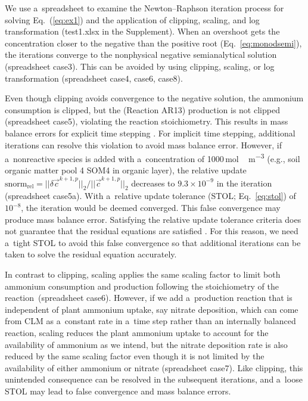 \documentclass[gmd,noline]{copernicus}
\begin{document}
      We use a~spreadsheet to examine the Newton--Raphson iteration process
      for solving Eq.~(\ref{eq:ex1}) and the application of clipping,
      scaling, and log transformation (test1.xlsx  in the Supplement). When an overshoot
      gets the concentration closer to the negative than the positive root
      (Eq.~\ref{eq:monodsemi}), the iterations converge to the nonphysical
      negative semianalytical solution (spreadsheet case3).  This can be
      avoided by using clipping, scaling, or log transformation (spreadsheet
      case4, case6, case8).

      Even though clipping avoids convergence to the negative solution, the
      ammonium consumption is clipped, but the   (Reaction AR13) production is
      not clipped (spreadsheet case5), violating the reaction
      stoichiometry. This results in mass balance errors for explicit time
      stepping \citep{Tang2015}. For implicit time stepping, additional
      iterations can resolve this violation to avoid mass balance error.
      However, if a~nonreactive species is added with a~concentration of
      1000\,\unit{mol\,m^{-3}} (e.g., soil organic matter pool 4 SOM4 in
      organic layer), the relative update $\text{snorm}_{\text{rel}}= {\vert\vert
      \delta \vec{c}^{k+1,p} \vert\vert_2} / {\vert\vert \vec{c}^{k+1,p} \vert\vert
      _2}$ decreases to $9.3\times 10^{-9}$ in the iteration (spreadsheet
      case5a). With a~relative update tolerance (STOL; Eq.~\ref{eq:stol}) of
      $10^{-8}$, the iteration would be deemed converged. This false
      convergence may produce mass balance error. Satisfying the relative
      update tolerance criteria does not guarantee that the residual
      equations are satisfied \citep{Lichtner2015}. For this reason, we need
      a~tight STOL to avoid this false convergence so that additional
      iterations can be taken to solve the residual equation accurately.

      In contrast to clipping, scaling applies the same scaling factor to
      limit both ammonium consumption and  production following
      the stoichiometry of the reaction~(spreadsheet case6). However, if we
      add a~production reaction that is independent of plant ammonium
      uptake, say nitrate deposition, which can come from CLM as a~constant
      rate in a~time step rather than an internally balanced reaction,
      scaling reduces the plant ammonium uptake to account for the
      availability of ammonium as we intend, but the nitrate deposition rate
      is also reduced by the same scaling factor even though it is not
      limited by the availability of either ammonium or nitrate (spreadsheet
      case7). Like clipping, this unintended consequence can be resolved in
      the subsequent iterations, and a~loose STOL may lead to false
      convergence and mass balance errors.
\end{document}
